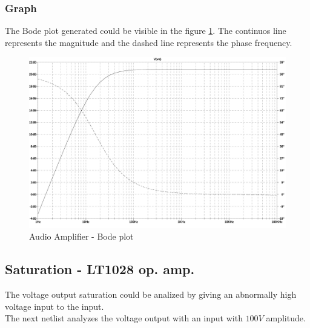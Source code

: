 \documentclass[10pt,a4paper]{article}
\begin{document}
\subsubsection{Graph}
The Bode plot generated could be visible in the figure \ref{1d3graph}.
The continuos line represents the magnitude and the dashed line represents the phase frequency.\\
\begin{figure}[H]
  \centering
  \includegraphics[width=14cm]{graph/1d3.jpg}
  \caption{Audio Amplifier - Bode plot}
  \label{1d3graph}
\end{figure}

\subsection{Saturation - LT1028 op. amp.}
The voltage output saturation could be analized by giving an abnormally high voltage input to the input.\\
The next netlist analyzes the voltage output with an input with $100V$ amplitude.\\


\end{document}
